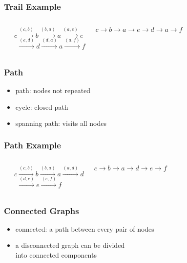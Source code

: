 \documentclass[dvipsnames]{beamer}
\begin{document}
\begin{frame}
  \frametitle{Trail Example}

  \begin{columns}
    \begin{center}
    \end{center}

    $c \xrightarrow{(c,b)} b \xrightarrow{(b,a)} a \xrightarrow{(a,e)} e$\\
    $~~\xrightarrow{(e,d)} d \xrightarrow{(d,a)} a \xrightarrow{(a,f)} f$

    \medskip
    $c \rightarrow b \rightarrow a \rightarrow e \rightarrow d \rightarrow a
        \rightarrow f$
  \end{columns}
\end{frame}

\begin{frame}
  \frametitle{Path}

  \begin{itemize}
    \item \alert{path}: nodes not repeated
    \item \alert{cycle}: closed path
    \item \alert{spanning} path: visits all nodes
  \end{itemize}
\end{frame}

\begin{frame}
  \frametitle{Path Example}

  \begin{columns}
    \begin{center}
    \end{center}

    $c \xrightarrow{(c,b)} b \xrightarrow{(b,a)} a \xrightarrow{(a,d)} d$\\
    $~~\xrightarrow{(d,e)} e \xrightarrow{(e,f)} f$

    \medskip
    $c \rightarrow b \rightarrow a \rightarrow d \rightarrow e \rightarrow f$
  \end{columns}
\end{frame}

\begin{frame}
  \frametitle{Connected Graphs}

  \begin{itemize}
    \item \alert{connected}: a path between every pair of nodes
    \item a disconnected graph can be divided\\
      into connected components
  \end{itemize}
\end{frame}
\end{document}
